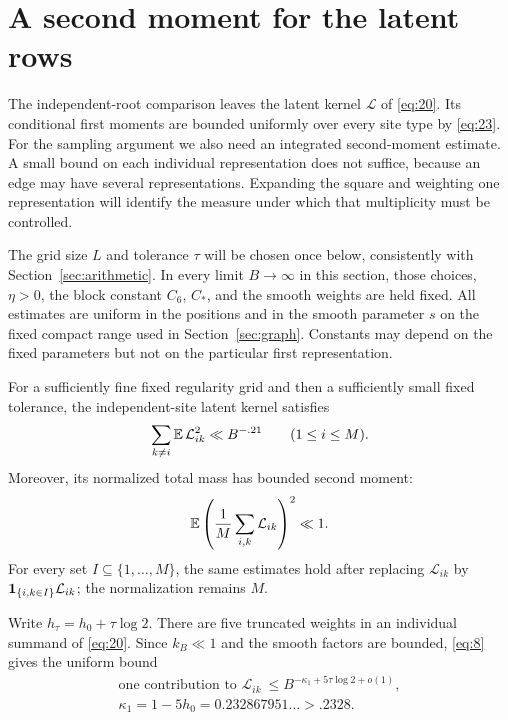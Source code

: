 \section{A second moment for the latent rows}
\label{sec:moments}

The independent-root comparison leaves the latent kernel
$\mathcal L$ of \eqref{eq:20}.  Its conditional first moments are bounded
uniformly over every site type by \eqref{eq:23}.  For the sampling argument
we also need an integrated second-moment estimate.  A small bound on each
individual representation does not suffice, because an edge may have
several representations. Expanding the square and weighting one
representation will identify the measure under which that multiplicity
must be controlled.

The grid size $L$ and tolerance $\tau$ will be chosen once below,
consistently with Section~\ref{sec:arithmetic}. In every limit
$B\to\infty$ in this section, those choices, $\eta>0$, the block constant
$C_6$, $C_*$, and the smooth weights are held fixed.
All estimates are uniform in the positions and in the smooth parameter
$s$ on the fixed compact range used in Section~\ref{sec:graph}.
Constants may depend on the fixed parameters but not on the particular
first representation.

\begin{proposition}
\label{prop:moments:rows}
For a sufficiently fine fixed regularity grid and then a sufficiently
small fixed tolerance, the independent-site latent kernel satisfies
\begin{equation}
 \sum_{k\ne i}\mathbb E\,\mathcal L_{ik}^{2}\ll B^{-.21}
 \qquad (1\le i\le M).
 \label{eq:24}
\end{equation}
Moreover, its normalized total mass has bounded second moment:
\[
 \mathbb E\left(\frac1M\sum_{i,k}\mathcal L_{ik}\right)^2\ll1.
\]
For every set $I\subseteq\{1,\ldots,M\}$, the same estimates hold after
replacing $\mathcal L_{ik}$ by
$\mathbf 1_{\{i,k\in I\}}\mathcal L_{ik}$; the normalization remains $M$.
\end{proposition}

Write $h_\tau=h_0+\tau\log2$.  There are five truncated weights in
an individual summand of \eqref{eq:20}.  Since $k_B\ll1$ and the smooth
factors are bounded, \eqref{eq:8} gives the uniform bound
\begin{equation}
\begin{gathered}
 \text{one contribution to }\mathcal L_{ik}
 \ \le B^{-\kappa_1+5\tau\log2+o(1)},
 \\
 \kappa_1=1-5h_0=0.232867951\ldots> .2328.
 \label{eq:25}
\end{gathered}
\end{equation}
